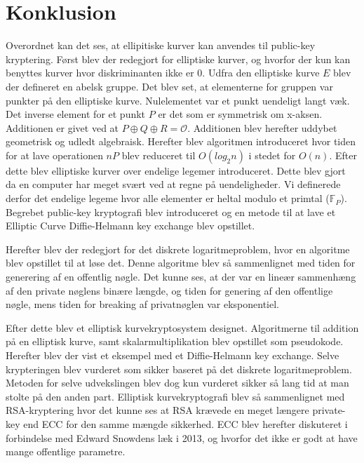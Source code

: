 \section{Konklusion}
Overordnet kan det ses, at ellipitiske kurver kan anvendes til public-key kryptering. Først blev der redegjort for elliptiske kurver, og hvorfor der kun kan benyttes kurver hvor diskriminanten ikke er 0. Udfra den elliptiske kurve $E$ blev der defineret en abelsk gruppe. Det blev set, at elementerne for gruppen var punkter på den elliptiske kurve. Nulelementet var et punkt uendeligt langt væk. Det inverse element for et punkt $P$ er det som er symmetrisk om x-aksen. Additionen er givet ved at $P\oplus Q\oplus R=\mathcal{O}$. Additionen blev herefter uddybet geometrisk og udledt algebraisk. Herefter blev algoritmen  introduceret hvor tiden for at lave operationen $nP$ blev reduceret til $O(log_{2}n)$ i stedet for $O(n)$.
Efter dette blev elliptiske kurver over endelige legemer introduceret. Dette blev gjort da en computer har meget svært ved at regne på uendeligheder. Vi definerede derfor det endelige legeme hvor alle elementer er heltal modulo et primtal ($\mathbb{F}_{P}$). Begrebet public-key kryptografi blev introduceret og en metode til at lave et Elliptic Curve Diffie-Helmann key exchange blev opstillet.

Herefter blev der redegjort for det diskrete logaritmeproblem, hvor en  algoritme blev opstillet til at løse det. Denne algoritme blev så sammenlignet med tiden for generering af en offentlig nøgle. Det kunne ses, at der var en lineær sammenhæng af den private nøglens binære længde, og tiden for genering af den offentlige nøgle, mens tiden for breaking af privatnøglen var eksponentiel. 

Efter dette blev et elliptisk kurvekryptosystem designet. Algoritmerne til addition på en elliptisk kurve, samt skalarmultiplikation blev opstillet som pseudokode. Herefter blev der vist et eksempel med et Diffie-Helmann key exchange. Selve krypteringen blev vurderet som sikker baseret på det diskrete logaritmeproblem. Metoden for selve udvekslingen blev dog kun vurderet sikker så lang tid at man stolte på den anden part. 
Elliptisk kurvekryptografi blev så sammenlignet med RSA-kryptering hvor det kunne ses at RSA krævede en meget længere private-key end ECC for den samme mængde sikkerhed. ECC blev herefter diskuteret i forbindelse med Edward Snowdens læk i 2013, og hvorfor det ikke er godt at have mange offentlige parametre.



